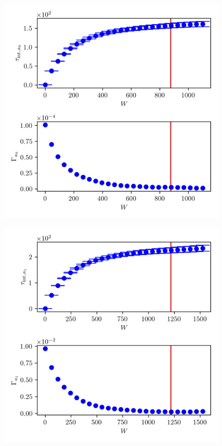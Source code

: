 \begin{figure}[ht!]
	\centering
	\includegraphics{UwerrTauIntTWalk6.png}
	\caption[]{}
	\label{fig:}
\end{figure}

\begin{figure}[ht!]
	\centering
	\includegraphics{UwerrTauIntTWalk7.png}
	\caption[]{}
	\label{fig:}
\end{figure}


